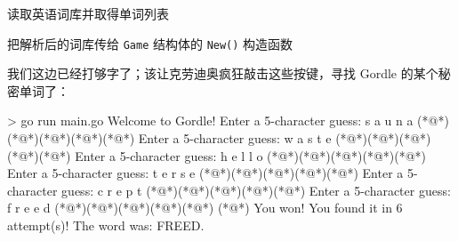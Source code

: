 
\begin{codeannotations}
\item 读取英语词库并取得单词列表
\item 把解析后的词库传给 \texttt{Game} 结构体的 \texttt{New()} 构造函数
\end{codeannotations}

我们这边已经打够字了；该让克劳迪奥疯狂敲击这些按键，寻找 Gordle 的某个秘密单词了：

\begin{shellcode}[]
> go run main.go
Welcome to Gordle!
Enter a 5-character guess:
 s a u n a
(*@\PocketGraySquare@*)(*@\PocketGraySquare@*)(*@\PocketGraySquare@*)(*@\PocketGraySquare@*)(*@\PocketGraySquare@*)
Enter a 5-character guess:
 w a s t e
(*@\PocketGraySquare@*)(*@\PocketGraySquare@*)(*@\PocketGraySquare@*)(*@\PocketGraySquare@*)(*@\PocketYellowCircle@*)
Enter a 5-character guess:
 h e l l o
(*@\PocketGraySquare@*)(*@\PocketYellowCircle@*)(*@\PocketGraySquare@*)(*@\PocketGraySquare@*)(*@\PocketGraySquare@*)
Enter a 5-character guess:
 t e r s e
(*@\PocketGraySquare@*)(*@\PocketYellowCircle@*)(*@\PocketYellowCircle@*)(*@\PocketGraySquare@*)(*@\PocketYellowCircle@*)
Enter a 5-character guess:
 c r e p t
(*@\PocketGraySquare@*)(*@\PocketGreenHeart@*)(*@\PocketGreenHeart@*)(*@\PocketGraySquare@*)(*@\PocketGraySquare@*)
Enter a 5-character guess:
 f r e e d
(*@\PocketGreenHeart@*)(*@\PocketGreenHeart@*)(*@\PocketGreenHeart@*)(*@\PocketGreenHeart@*)(*@\PocketGreenHeart@*)
(*@\PocketParty@*) You won! You found it in 6 attempt(s)! The word was: FREED.
\end{shellcode}

